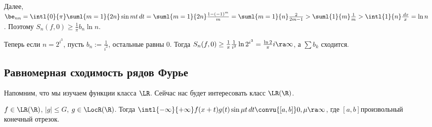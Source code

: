 \documentclass[a4paper]{article}
\newcommand{\intlop}{\intl{0}{\pi}}
\newcommand{\intlii}{\intl{-\infty}{+\infty}}
\newcommand{\frpi}{\frac{1}{\pi}}
\begin{document}
Далее, $\be_{nn} = \intlop \suml{m=1}{2n}\sin mt \,d t = \suml{m=1}{2n}\frac{1-(-1)^m}{m} =
\suml{m=1}{n} \frac{2}{2m-1} > \suml{1}{m}\frac{1}{m} > \intl{1}{n}\frac{\,d x}{x} = \ln n$.
Поэтому $S_n(f,0) \ge \frpi b_n\ln n$.

Теперь если $n = 2^{i^3}$, пусть $b_n := \frac{1}{i^2}$, остальные равны 0. Тогда $S_n(f,0) \ge \frpi \frac{1}{i^2}\ln 2^{i^3} =
\frac{\ln 2}{\pi} i \ra \infty$, а $\sum b_k$ сходится.

\subsection{Равномерная сходимость рядов Фурье}

Напомним, что мы изучаем функции класса $\LR$. Сейчас нас будет интересовать класс $\LR(\R)$.
\begin{theorem}[ОЛР]
$f \in\LR(\R)$, $|g| \le G$, $g \in\LocR(\R)$. Тогда $\intlii f(x+t)g(t)\sin \mu t \,d t
\convu{[a,b]} 0, \mu \ra \infty$, где $[a,b]$\т произвольный конечный отрезок.
\end{theorem}
\end{document}
